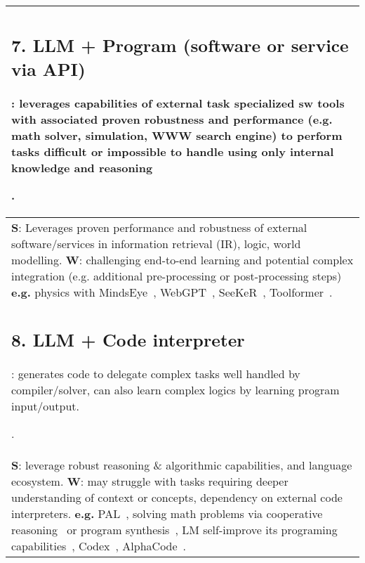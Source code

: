 \documentclass[acmsmall]{acmart}
\begin{document}
{\begin{longtable}{p{1\linewidth}}
{\subsection{7. LLM + Program (software or service via API)}\label{HP7}:
leverages capabilities of external task specialized sw tools with associated proven robustness and performance (e.g. math solver, simulation, WWW search engine) to perform tasks difficult or impossible to handle using only internal knowledge and reasoning}. \\\midrule  
{\textbf{S}: Leverages proven performance and robustness of external software/services in information retrieval (IR), logic, world modelling. 
\newline \textbf{W}:} challenging end-to-end learning and potential complex integration (e.g. additional pre-processing or post-processing steps) \newline \textbf{e.g.} physics with MindsEye~\citep{liuMindEyeGrounded2022}, WebGPT~\citep{nakanoWebGPTBrowserassistedQuestionanswering2022}, SeeKeR~\citep{shusterLanguageModelsThat2022}, Toolformer~\citep{schickToolformerLanguageModels2023}. \\\midrule

{\subsection{8. LLM + Code interpreter}\label{HP8}:
generates code to delegate complex tasks well handled by compiler/solver, can also learn complex logics by learning program input/output.}. \\\midrule  
{\textbf{S}: leverage robust reasoning \& algorithmic capabilities, and language ecosystem.
\newline \textbf{W}:} may struggle with tasks requiring deeper understanding of context or concepts, dependency on external code interpreters. \newline \textbf{e.g.} PAL~\citep{gaoPALProgramaidedLanguage2023}, solving math problems via cooperative reasoning~\citep{zhuSolvingMathWord2022} or program synthesis~\citep{droriNeuralNetworkSolves2022}, LM self-improve its programing capabilities~\citep{haluptzokLanguageModelsCan2022}, Codex~\citep{chenEvaluatingLargeLanguage2021}, AlphaCode~\citep{liCompetitionLevelCodeGeneration2022}. \\\midrule


\end{longtable}}
\end{document}
